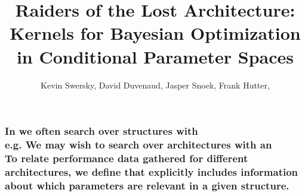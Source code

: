 \documentclass[12pt,onlymath]{beamer}
\begin{document}
\title{\textbf{\textcolor{b160A}{Raiders of the Lost Architecture:\\Kernels for Bayesian Optimization in Conditional Parameter Spaces}}}

\author{Kevin Swersky, David Duvenaud, Jasper Snoek, Frank Hutter, {}}

\begin{frame}\frametitle{}
\maketitle
\end{frame}

\begin{frame}

\frametitle{%
	In  we often search over structures with 
	\\[0.5cm]
	e.g. We may wish to search over  architectures with an 
	\\[0.5cm]
	To relate performance data gathered for different architectures, we define  that explicitly includes information about which parameters are relevant in a given structure.
}

\end{frame}
\end{document}
